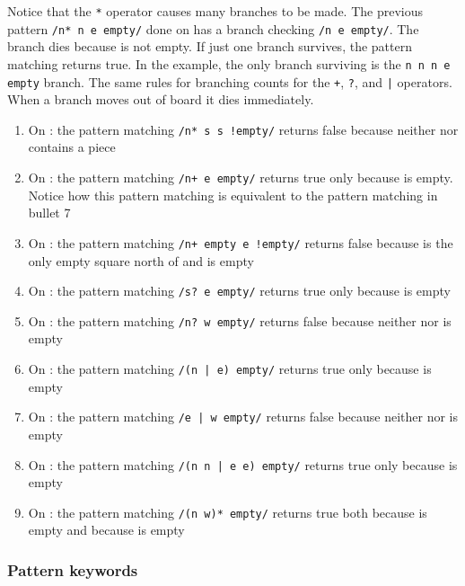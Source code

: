 Notice that the \texttt{*} operator causes many branches to be made. The
previous pattern \texttt{/n* n e empty/} done on   has a branch checking
\texttt{/n e empty/}. The branch dies because  is not empty. If just one
branch survives, the pattern matching returns true. In the example, the only branch
surviving is the \texttt{n n n e empty} branch. The same rules for branching
counts for the \texttt{+}, \texttt{?}, and \texttt{|} operators. When a branch
moves out of board it dies immediately.

\begin{enumerate}
  \item On : the pattern matching \texttt{/n* s s !empty/} returns
    false because neither  nor  contains a piece
  \item On : the pattern matching \texttt{/n+ e empty/} returns true
    only because  is empty. Notice how this pattern matching is
    equivalent to the pattern matching in bullet 7
  \item On : the pattern matching \texttt{/n+ empty e !empty/}
    returns false because  is the only empty square north of
     and  is empty
  \item On : the pattern matching \texttt{/s? e empty/} returns true
    only because  is empty 
  \item On : the pattern matching \texttt{/n? w empty/} returns false
    because neither  nor  is empty
  \item On : the pattern matching \texttt{/(n | e) empty/} returns
    true only because  is empty
  \item On : the pattern matching \texttt{/e | w empty/} returns
    false because neither  nor  is empty
  \item On : the pattern matching \texttt{/(n n | e e) empty/}
    returns true only because  is empty
  \item On : the pattern matching \texttt{/(n w)* empty/} returns
    true both because  is empty and because  is empty
\end{enumerate}

\subsubsection{Pattern keywords}

